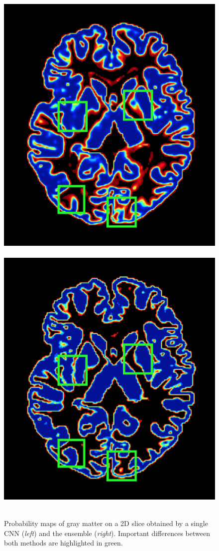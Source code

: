 \documentclass[twoside,espcrc2]{elsarticle}
\begin{document}
\begin{figure}[ht!]
     \begin{center}
     \mbox{
        \includegraphics[width=0.45\linewidth]{WM_Detail_Single.png}
        \includegraphics[width=0.45\linewidth]{WM_Detail_Ensemble.png}
        }
\caption{Probability maps of gray matter on a 2D slice obtained by a single CNN (\textit{left}) and the ensemble (\textit{right}). Important differences between both methods are highlighted in green.}
\label{fig:probMapsGM}
\end{center}
\end{figure}
\end{document}

